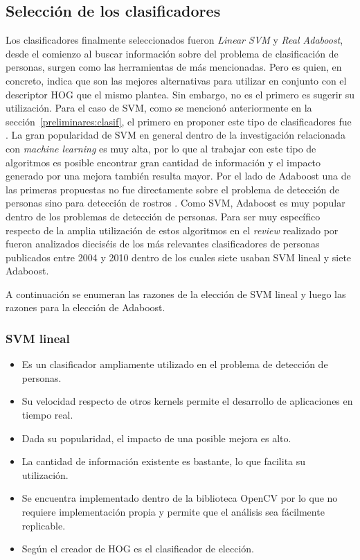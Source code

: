 \subsection{Selección de los clasificadores}
\label{subsect:seleccionclasif}

Los clasificadores finalmente seleccionados fueron \textit{Linear SVM} y \textit{Real Adaboost}, desde el comienzo al buscar información sobre del problema de clasificación de personas, surgen como las herramientas de más mencionadas. Pero es \cite{dalal2006} quien, en concreto, indica que son las mejores alternativas para utilizar en conjunto con el descriptor HOG que el mismo plantea. Sin embargo, no es el primero es sugerir su utilización. Para el caso de SVM, como se mencionó anteriormente en la sección~\ref{preliminares:clasif}, el primero en proponer este tipo de clasificadores fue \cite{Papageorgiou2000}. La gran popularidad de SVM en general dentro de la investigación relacionada con \textit{machine learning} es muy alta, por lo que al trabajar con este tipo de algoritmos es posible encontrar gran cantidad de información y el impacto generado por una mejora también resulta mayor. Por el lado de Adaboost una de las primeras propuestas no fue directamente sobre el problema de detección de personas sino para detección de rostros \citep{viola2001}. Como SVM, Adaboost es muy popular dentro de los problemas de detección de personas. Para ser muy específico respecto de la amplia utilización de estos algoritmos en el \textit{review} realizado por \cite{dollar2012} fueron analizados dieciséis de los más relevantes clasificadores de personas publicados entre 2004 y 2010 dentro de los cuales siete usaban SVM lineal y siete Adaboost.

A continuación se enumeran las razones de la elección de SVM lineal y luego las razones para la elección de Adaboost.

\subsubsection{SVM lineal}

\begin{itemize}
\item Es un clasificador ampliamente utilizado en el problema de detección de personas.
\item Su velocidad respecto de otros kernels permite el desarrollo de aplicaciones en tiempo real.
\item Dada su popularidad, el impacto de una posible mejora es alto.
\item La cantidad de información existente es bastante, lo que facilita su utilización.
\item Se encuentra implementado dentro de la biblioteca OpenCV por lo que no requiere implementación propia y permite que el análisis sea fácilmente replicable.
\item Según el creador de HOG \citep{dalal2006} es el clasificador de elección.
\end{itemize}

